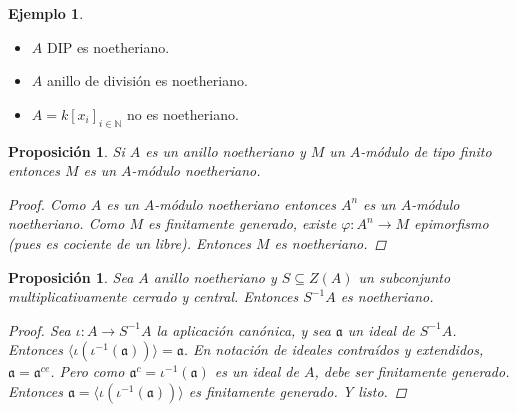 \documentclass[12pt]{book}
\newtheorem{prop}[teo]{Proposición}
\theoremstyle{definition}
\newtheorem{ex}[teo]{Ejemplo}
\newcommand{\NN}{\mathbb{N}}
\begin{document}
\begin{ex}
\begin{itemize}
\item $A$ DIP es noetheriano.
\item $A$ anillo de división es noetheriano.
\item $A=k[x_i]_{i\in\NN}$ no es noetheriano.
\end{itemize}
\end{ex}

\begin{prop}
Si $A$ es un anillo noetheriano y $M$ un $A$-módulo de tipo finito entonces $M$ es un $A$-módulo noetheriano.
\begin{proof}
Como $A$ es un $A$-módulo noetheriano entonces $A^n$ es un $A$-módulo noetheriano. Como $M$ es finitamente generado, existe $\varphi:A^n\to M$ epimorfismo (pues es cociente de un libre). Entonces $M$ es noetheriano.
\end{proof}
\end{prop}

\begin{prop}
Sea $A$ anillo noetheriano y $S\subseteq Z(A)$ un subconjunto multiplicativamente cerrado y central. Entonces $S^{-1}A$ es noetheriano.
\begin{proof}
Sea $\iota:A\to S^{-1}A$ la aplicación canónica, y sea $\mathfrak{a}$ un ideal de $S^{-1}A$. Entonces $\langle \iota(\iota^{-1}(\mathfrak{a}))\rangle = \mathfrak{a}$. En notación de ideales contraídos y extendidos, $\mathfrak{a}=\mathfrak{a}^{ce}$. Pero como $\mathfrak{a}^c = \iota^{-1}(\mathfrak{a})$ es un ideal de $A$, debe ser finitamente generado. Entonces $\mathfrak{a} = \langle \iota(\iota^{-1}(\mathfrak{a})) \rangle$ es finitamente generado. Y listo.
\end{proof}
\end{prop}
\end{document}
